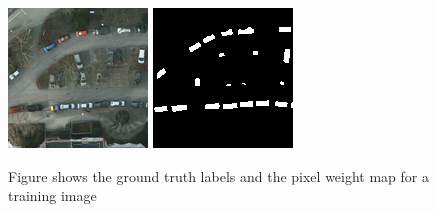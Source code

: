 \documentclass{kththesis}
\begin{document}
\begin{figure}[H]
\centering
{}
  \includegraphics[width=\linewidth]{trees}
\endminipage\hfill
{}
  \includegraphics[width=\linewidth]{trees_label}
\endminipage\hfill
\caption{Figure shows the ground truth labels and the pixel weight map for a training image}
\end{figure}
\end{document}
